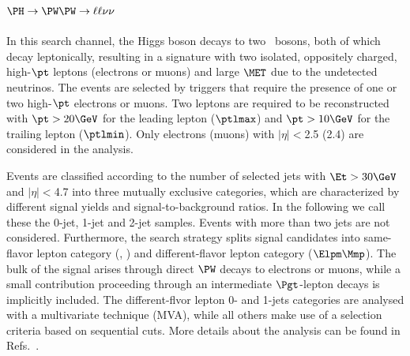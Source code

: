 


\subsection{$\PH \to \PW\PW \to \ell\ell\nu\nu$}

In this search channel, the Higgs boson decays to two \PW\ bosons, both
of which decay leptonically, resulting in a signature with two isolated,
oppositely charged, high-$\pt$ leptons (electrons or muons) and large
$\MET$ due to the undetected neutrinos.
The events are selected by triggers that require the presence of one or
two high-$\pt$ electrons or muons. 
Two leptons are required to be reconstructed with $\pt
>20\GeV$ for the leading lepton ($\ptlmax$) and $\pt >10\GeV$ for the
trailing lepton ($\ptlmin$).  Only electrons (muons) with $|\eta|
<$2.5 (2.4) are considered in the analysis.

Events are classified according to the number of selected jets
with $\Et>30\GeV$ and $|\eta|<$4.7
into three mutually exclusive categories, which are characterized by
different signal yields and signal-to-background ratios.  In the
following we call these the 0-jet, 1-jet and 2-jet samples.  Events
with more than two jets are not considered.  Furthermore, the search
strategy splits signal candidates into same-flavor lepton category 
(\Pep\Pem, \mumu) and different-flavor lepton category ($\Elpm\Mmp$).
The bulk of the signal arises through direct $\PW$ decays to electrons
or muons, while a 
small contribution proceeding
through an intermediate $\Pgt$-lepton decays is implicitly included.  
The different-flvor lepton 0- and 1-jets categories are
analysed with a multivariate technique (MVA), while all others make use of a
selection criteria based on sequential cuts.
More details about the analysis can be found 
in Refs.~\cite{Chatrchyan:2012ty,cmsobsboson}.

